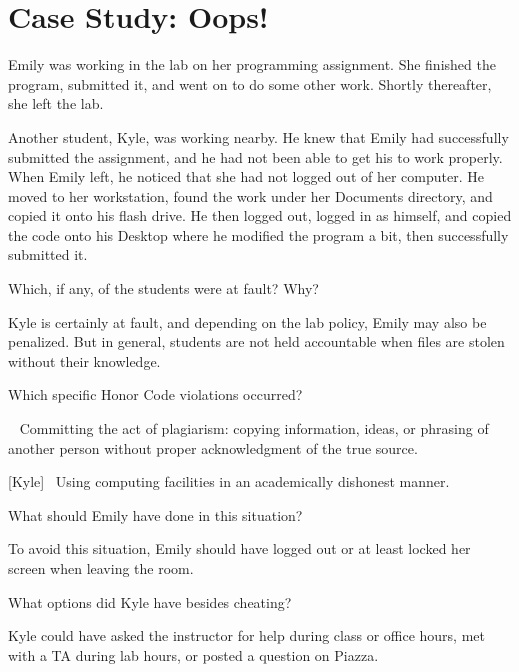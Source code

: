 \section*{Case Study: Oops!}

Emily was working in the lab on her programming assignment.
She finished the program, submitted it, and went on to do some other work.
Shortly thereafter, she left the lab.

\vspace{1em}

Another student, Kyle, was working nearby.
He knew that Emily had successfully submitted the assignment, and he had not been able to get his to work properly.
When Emily left, he noticed that she had not logged out of her computer.
He moved to her workstation, found the work under her Documents directory, and copied it onto his flash drive.
He then logged out, logged in as himself, and copied the code onto his Desktop where he modified the program a bit, then successfully submitted it.




\Q Which, if any, of the students were at fault? Why?

\begin{answer}[6em]
Kyle is certainly at fault, and depending on the lab policy, Emily may also be penalized.
But in general, students are not held accountable when files are stolen without their knowledge.
\end{answer}


\Q Which specific Honor Code violations occurred?

\begin{answer}[7em]
[Kyle]~ Committing the act of plagiarism: copying information, ideas, or phrasing of another person without proper acknowledgment of the true source.

\bigskip

[Kyle]~ Using computing facilities in an academically dishonest manner.
\end{answer}


\Q What should Emily have done in this situation?

\begin{answer}[6em]
To avoid this situation, Emily should have logged out or at least locked her screen when leaving the room.
\end{answer}


\Q What options did Kyle have besides cheating?

\begin{answer}[6em]
Kyle could have asked the instructor for help during class or office hours, met with a TA during lab hours, or posted a question on Piazza.
\end{answer}
